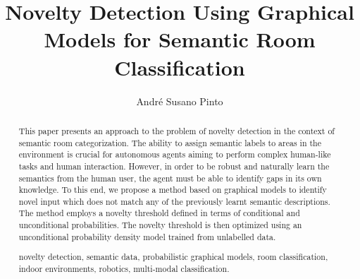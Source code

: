 \documentclass[runningheads,a4paper]{llncs}
\newcommand{\keywords}[1]{\par\addvspace\baselineskip
\noindent\keywordname\enspace\ignorespaces#1}
\begin{document}
\mainmatter  %

\title{Novelty Detection Using Graphical Models for Semantic Room Classification}


%
%
\author{André Susano Pinto}
%


\maketitle


\begin{abstract}
This paper presents an approach to the problem of novelty
detection in the context of semantic room categorization.
The ability to assign semantic labels to areas in the environment is crucial for
autonomous agents aiming to perform complex human-like tasks and human
interaction.
However, in order to be robust and naturally learn the semantics from
the human user, the agent must be able to identify gaps in its own knowledge.
To this end, we propose a method based on graphical models to identify novel
input which does not match any of the previously learnt semantic descriptions.
The method employs a novelty threshold defined in terms of conditional
and unconditional probabilities. The novelty threshold is then optimized using
an unconditional probability density model trained from unlabelled data.


\keywords{novelty detection, semantic data, probabilistic graphical models,
room classification, indoor environments, robotics, multi-modal classification.}
\end{abstract}
\end{document}
